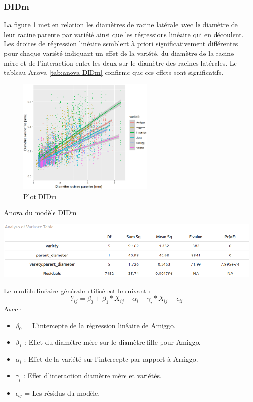 \subsubsection{DIDm}

La figure \ref{fig:plot DIDm} met en relation les diamètres de racine latérale avec le diamètre de leur racine parente par variété ainsi que les régressions linéaire qui en découlent.
Les droites de régression linéaire semblent à priori significativement différentes pour chaque variété indiquant un effet de la variété, du diamètre de la racine mère et de l'interaction entre les deux sur le diamètre des racines latérales.
Le tableau Anova \ref{tab:anova DIDm} confirme que ces effets sont significatifs.
\newpage

\begin{figure}[ht]
\centering
\includegraphics[width=0.6\textwidth]{Image/plot DIDm.png}
\caption{Plot DIDm}
\label{fig:plot DIDm}
\end{figure}

\begin{table}[ht]
    \centering
    \caption{Anova du modèle DIDm}
    \includegraphics[width=1\textwidth]{Image/anova DIDm.png}
    \label{tab:anova DIDm}
\end{table}

Le modèle linéaire générale utilisé est le suivant : 
\begin{equation}
Y_{ij}=\beta_{0}+\beta_{1}*X_{ij}+\alpha_{i}+\gamma_{i}*X_{ij}+\epsilon_{ij}
\end{equation}
Avec : 
\begin{itemize}
    \item $\beta_{0}$ = L'intercepte de la régression linéaire de Amiggo.
    \item $\beta_{1}$ : Effet du diamètre mère sur le diamètre fille pour Amiggo.
    \item $\alpha_{i}$ : Effet de la variété sur l'intercepte par rapport à Amiggo.
    \item $\gamma_{i}$ : Effet d'interaction diamètre mère et variétés.
    \item $\epsilon_{ij}$ = Les résidus du modèle.
\end{itemize}

